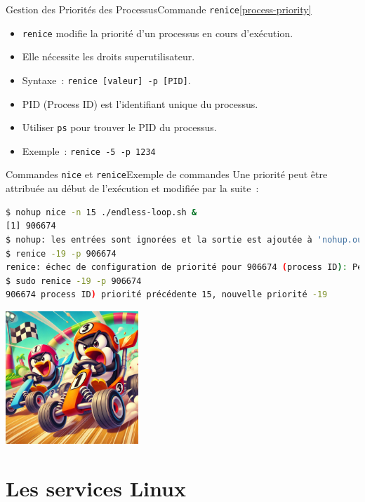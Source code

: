 \documentclass{beamer}
\begin{document}
    \begin{frame}{Gestion des Priorités des Processus}{Commande \lstinline{renice}\cref{process-priority}}
        \begin{itemize}
            \item \lstinline{renice} modifie la priorité d'un processus en cours d'exécution.
            \item Elle nécessite les droits superutilisateur.
            \item Syntaxe~: \lstinline{renice [valeur] -p [PID]}.
            \item PID (Process ID) est l'identifiant unique du processus.
            \item Utiliser \lstinline{ps} pour trouver le PID du processus.
            \item Exemple~: \lstinline{renice -5 -p 1234}
        \end{itemize}
    \end{frame}

    \begin{frame}[fragile]{Commandes \lstinline{nice} et \lstinline{renice}}{Exemple de commandes}
        Une priorité peut être attribuée au début de l'exécution et modifiée par la suite~:
        \begin{lstlisting}[language=bash]
$ nohup nice -n 15 ./endless-loop.sh & 
[1] 906674
$ nohup: les entrées sont ignorées et la sortie est ajoutée à 'nohup.out'
$ renice -19 -p 906674
renice: échec de configuration de priorité pour 906674 (process ID): Permission non accordée
$ sudo renice -19 -p 906674
906674 process ID) priorité précédente 15, nouvelle priorité -19
        \end{lstlisting}
        \begin{center}
            \includegraphics[width=5cm]{image/pinguins-racing}
        \end{center}
    \end{frame}


    \section{Les services Linux}\label{sec:les-services}
\end{document}
